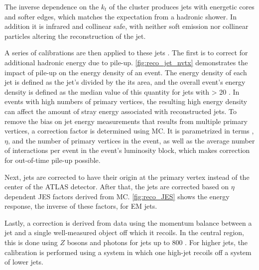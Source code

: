 The inverse dependence on the $k_t$ of the cluster produces jets with energetic cores and softer edges, which matches the expectation from a hadronic shower. In addition it is infrared and collinear safe, with neither soft emission nor collinear particles altering the reconstruction of the jet.

A series of calibrations are then applied to these jets \cite{PERF-2012-01}. The first is to correct for additional hadronic energy due to pile-up. \autoref{fig:reco_jet_nvtx} demonstrates the impact of pile-up on the energy density of an event. The energy density of each jet is defined as the jet's \pt divided by the its area, and the overall event's energy density is defined as the median value of this quantity for jets with \pt > 20 \gev. In events with high numbers of primary vertices, the resulting high energy density can affect the amount of stray energy associated with reconstructed jets. To remove the bias on jet energy measurements that results from multiple primary vertices, a correction factor is determined using \ac{MC}. It is parametrized in terms \pt, $\eta$, and the number of primary vertices in the event, as well as the average number of interactions per event in the event's luminosity block, which makes correction for out-of-time pile-up possible. 

Next, jets are corrected to have their origin at the primary vertex instead of the center of the \ac{ATLAS} detector. After that, the jets are corrected based on $\eta$ dependent \acf{JES} factors derived from \ac{MC}. \autoref{fig:reco_JES} shows the energy response, the inverse of these factors, for \ac{EM} jets. %

Lastly, a correction is derived from data using the momentum balance between a jet and a single well-measured object off which it recoils. In the central region, this is done using $Z$ bosons and photons for jets up to 800 \gev. For higher \pt jets, the calibration is performed using a system in which one high-\pt jet recoils off a system of lower \pt jets. 

